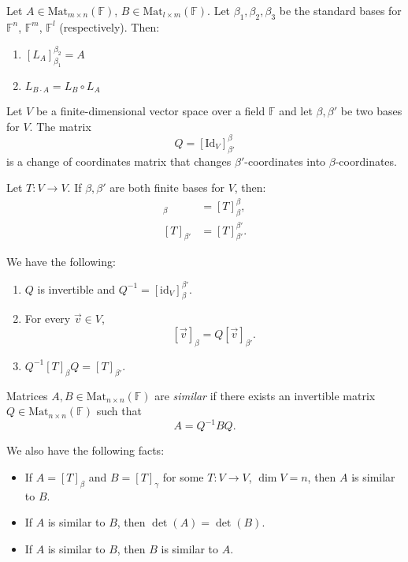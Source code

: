 \documentclass{article}
\begin{document}
\begin{lemma}
Let \( A \in \mathrm{Mat}_{m \times n}(\mathbb{F}) \), \( B \in \mathrm{Mat}_{l \times m}(\mathbb{F}) \). Let \( \beta_1, \beta_2, \beta_3 \) be the standard bases for \( \mathbb{F}^n \), \( \mathbb{F}^m \), \( \mathbb{F}^l \) (respectively). Then:
\begin{enumerate}
    \item \([L_A]_{\beta_1}^{\beta_2} = A\)
    \item \( L_{B \cdot A} = L_B \circ L_A \)
\end{enumerate}
\end{lemma}


\begin{definition}
Let \( V \) be a finite-dimensional vector space over a field \( \mathbb{F} \) and let \( \beta, \beta' \) be two bases for \( V \). The matrix
\[
Q = [\mathrm{Id}_V]_{\beta'}^{\beta}
\]
is a change of coordinates matrix that changes \( \beta' \)-coordinates into \( \beta \)-coordinates.
\end{definition}

\begin{definition}
Let \( T: V \to V \). If \( \beta, \beta' \) are both finite bases for \( V \), then:
\begin{align*}
[T]_{\beta} &= [T]_{\beta}^{\beta}, \\
[T]_{\beta'} &= [T]_{\beta'}^{\beta'}.
\end{align*}
\end{definition}

\begin{theorem} 
We have the following:
\begin{enumerate}
    \item \( Q \) is invertible and \( Q^{-1} = [\mathrm{id}_V]_{\beta}^{\beta'} \).
    \item For every \( \vec{v} \in V \),
    \[
    [\vec{v}]_{\beta} = Q [\vec{v}]_{\beta'}.
    \]
    \item \( Q^{-1} [T]_{\beta} Q = [T]_{\beta'} \).
\end{enumerate}
\end{theorem}


\begin{definition}
Matrices \( A, B \in \mathrm{Mat}_{n \times n}(\mathbb{F}) \) are \emph{similar} if there exists an invertible matrix \( Q \in \mathrm{Mat}_{n \times n}(\mathbb{F}) \) such that 
\[
A = Q^{-1} B Q.
\]

We also have the following facts:
\begin{itemize}
    \item If \( A = [T]_{\beta} \) and \( B = [T]_{\gamma} \) for some \( T: V \to V \), \(\dim V = n\), then \( A \) is similar to \( B \).
    \item If \( A \) is similar to \( B \), then \(\det(A) = \det(B)\).
    \item If \( A \) is similar to \( B \), then \( B \) is similar to \( A \).
\end{itemize}

\end{definition}
\end{document}
